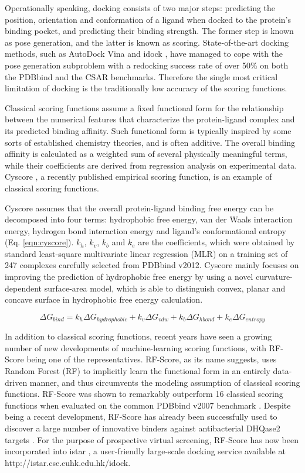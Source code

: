 \documentclass[journal=jacsat,manuscript=article]{achemso}
\begin{document}
Operationally speaking, docking consists of two major steps: predicting the position, orientation and conformation of a ligand when docked to the protein's binding pocket, and predicting their binding strength. The former step is known as pose generation, and the latter is known as scoring. State-of-the-art docking methods, such as AutoDock Vina \cite{595} and idock \cite{1153}, have managed to cope with the pose generation subproblem with a redocking success rate of over 50\% \cite{1362} on both the PDBbind \cite{529,530} and the CSAR \cite{857,960} benchmarks. Therefore the single most critical limitation of docking is the traditionally low accuracy of the scoring functions.

Classical scoring functions assume a fixed functional form for the relationship between the numerical features that characterize the protein-ligand complex and its predicted binding affinity. Such functional form is typically inspired by some sorts of established chemistry theories, and is often additive. The overall binding affinity is calculated as a weighted sum of several physically meaningful terms, while their coefficients are derived from regression analysis on experimental data. Cyscore \cite{1372}, a recently published empirical scoring function, is an example of classical scoring functions.

Cyscore assumes that the overall protein-ligand binding free energy can be decomposed into four terms: hydrophobic free energy, van der Waals interaction energy, hydrogen bond interaction energy and ligand's conformational entropy (Eq. \ref{eqn:cyscore}). $k_h$, $k_v$, $k_b$ and $k_e$ are the coefficients, which were obtained by standard least-square multivariate linear regression (MLR) on a training set of 247 complexes carefully selected from PDBbind v2012. Cyscore mainly focuses on improving the prediction of hydrophobic free energy by using a novel curvature-dependent surface-area model, which is able to distinguish convex, planar and concave surface in hydrophobic free energy calculation.

\begin{equation}
\Delta G_{bind} = k_h\Delta G_{hydrophobic} + k_v\Delta G_{vdw} + k_b\Delta G_{hbond} + k_e\Delta G_{entropy}
\label{eqn:cyscore}
\end{equation}

In addition to classical scoring functions, recent years have seen a growing number of new developments of machine-learning scoring functions, with RF-Score \cite{564} being one of the representatives. RF-Score, as its name suggests, uses Random Forest (RF) \cite{1309} to implicitly learn the functional form in an entirely data-driven manner, and thus circumvents the modeling assumption of classical scoring functions. RF-Score was shown to remarkably outperform 16 classical scoring functions when evaluated on the common PDBbind v2007 benchmark \cite{564}. Despite being a recent development, RF-Score has already been successfully used to discover a large number of innovative binders against antibacterial DHQase2 targets \cite{1281}. For the purpose of prospective virtual screening, RF-Score has now been incorporated into istar \cite{1362}, a user-friendly large-scale docking service available at http://istar.cse.cuhk.edu.hk/idock.
\end{document}
